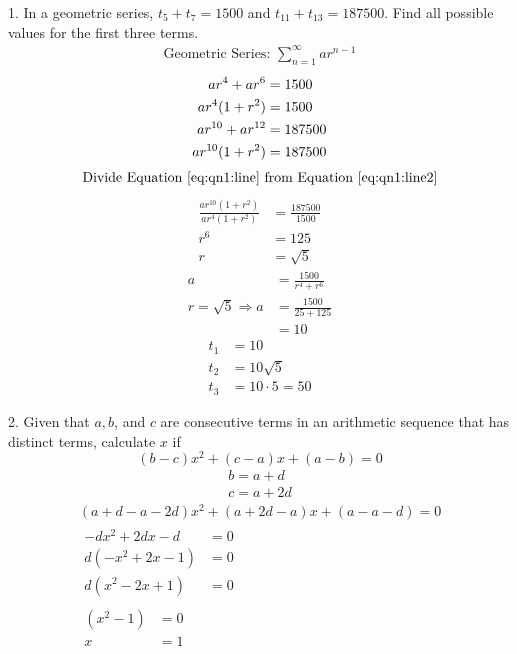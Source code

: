 \documentclass[12pt]{article}
\begin{document}
1. In a geometric series, $t_5 + t_7 = 1500$ and $t_{11}+t_{13}=187500$. Find all possible values for the first three terms.
\begin{gather*}
	\text{Geometric Series: } \displaystyle\sum_{n=1}^{\infty}ar^{n-1}
\end{gather*}
\begin{align}
	ar^{4} + ar^{6}    & = 1500                   \notag   \\
	ar^4(1 + r^2)      & = 1500        \label{eq:qn1:line} \\
	ar^{10} + ar^{12}  & = 187500                \notag    \\
	ar^{10}(1 + r^{2}) & = 187500 \label{eq:qn1:line2}
\end{align}
\begin{gather*}
	\text{Divide Equation } \eqref{eq:qn1:line} \text{ from Equation } \eqref{eq:qn1:line2}
\end{gather*}
\begin{align*}
	\frac{ar^{10}(1+r^2)}{ar^4(1+r^2)} & = \frac{187500}{1500} \\
	r^6                                & = 125                 \\
	r                                  & = \sqrt{5}
\end{align*}
\begin{align*}
	a                          & = \frac{1500}{r^4+r^6} \\
	r = \sqrt{5} \Rightarrow a & = \frac{1500}{25+125}  \\
	                           & = 10
\end{align*}
\begin{align*}
	t_1 & = 10            \\
	t_2 & = 10\sqrt{5}    \\
	t_3 & = 10\cdot5 = 50
\end{align*}

2. Given that $a, b$, and $c$ are consecutive terms in an arithmetic sequence that has distinct terms, calculate $x$ if
\[
	(b-c)x^2+(c-a)x+(a-b)=0
\]
\begin{gather*}
	b = a + d  \\
	c = a + 2d
\end{gather*}
\begin{gather*}
	(a+d-a-2d)x^2+(a+2d-a)x+(a-a-d) = 0 \\
	\begin{aligned}
		-dx^2+2dx-d  & = 0 \\
		d(-x^2+2x-1) & = 0 \\
		d(x^2-2x+1)  & = 0
	\end{aligned} \\
	\begin{aligned}
		(x^2-1) & = 0 \\
		x       & = 1
	\end{aligned}
\end{gather*}
\end{document}

